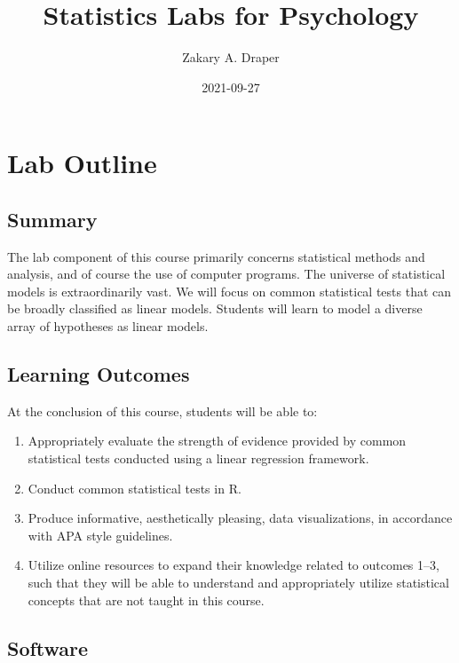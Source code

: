 \documentclass[
]{book}
\title{Statistics Labs for Psychology}
\author{Zakary A. Draper}
\date{2021-09-27}
\providecommand{\tightlist}{%
  \setlength{\itemsep}{0pt}\setlength{\parskip}{0pt}}
\begin{document}
\maketitle

{
\setcounter{tocdepth}{1}
\tableofcontents
}
\hypertarget{lab-outline}{%
\chapter*{Lab Outline}\label{lab-outline}}

\hypertarget{summary}{%
\section*{Summary}\label{summary}}

The lab component of this course primarily concerns statistical methods and analysis, and of course the use of computer programs. The universe of statistical models is extraordinarily vast. We will focus on common statistical tests that can be broadly classified as linear models. Students will learn to model a diverse array of hypotheses as linear models.

\hypertarget{learning-outcomes}{%
\section*{Learning Outcomes}\label{learning-outcomes}}

At the conclusion of this course, students will be able to:

\begin{enumerate}
\def\labelenumi{\arabic{enumi}.}
\tightlist
\item
  Appropriately evaluate the strength of evidence provided by common statistical tests conducted using a linear regression framework.
\item
  Conduct common statistical tests in R.
\item
  Produce informative, aesthetically pleasing, data visualizations, in accordance with APA style guidelines.
\item
  Utilize online resources to expand their knowledge related to outcomes 1--3, such that they will be able to understand and appropriately utilize statistical concepts that are not taught in this course.
\end{enumerate}

\hypertarget{software}{%
\section*{Software}\label{software}}
\end{document}
